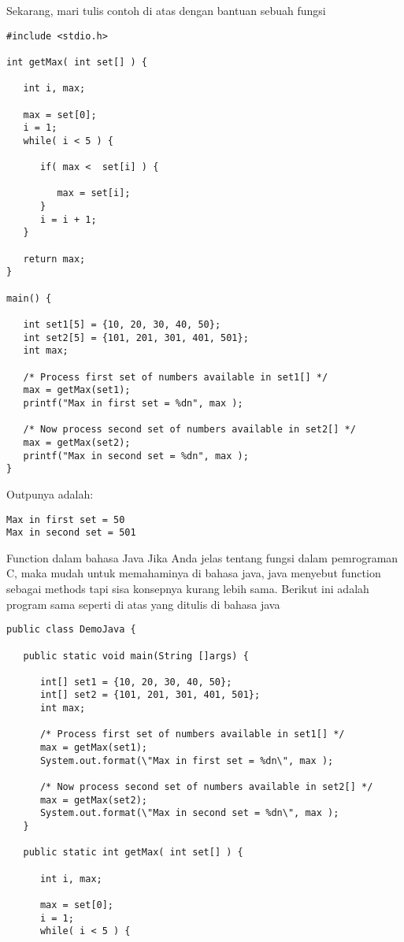 Sekarang, mari tulis contoh di atas dengan bantuan sebuah fungsi
\begin {verbatim}
#include <stdio.h>
 
int getMax( int set[] ) {
 
   int i, max;
    
   max = set[0];
   i = 1;    
   while( i < 5 ) {
   
      if( max <  set[i] ) {
     
         max = set[i];
      }
      i = i + 1;
   }
     
   return max;
}
 
main() {
 
   int set1[5] = {10, 20, 30, 40, 50};
   int set2[5] = {101, 201, 301, 401, 501};
   int max;
 
   /* Process first set of numbers available in set1[] */
   max = getMax(set1);
   printf("Max in first set = %
     
   /* Now process second set of numbers available in set2[] */
   max = getMax(set2);
   printf("Max in second set = %
}
\end {verbatim}
Outpunya adalah: 
\begin {verbatim}
Max in first set = 50
Max in second set = 501
\end {verbatim}

Function dalam bahasa Java
Jika Anda jelas tentang fungsi dalam pemrograman C, maka mudah untuk memahaminya di bahasa java, java menyebut function sebagai methods tapi sisa konsepnya kurang lebih sama. 
Berikut ini adalah program sama seperti di atas yang ditulis di bahasa java 
\begin {verbatim}
public class DemoJava {
     
   public static void main(String []args) {
  
      int[] set1 = {10, 20, 30, 40, 50};
      int[] set2 = {101, 201, 301, 401, 501};
      int max;
 
      /* Process first set of numbers available in set1[] */
      max = getMax(set1);
      System.out.format(\"Max in first set = %
 
      /* Now process second set of numbers available in set2[] */
      max = getMax(set2);
      System.out.format(\"Max in second set = %
   }
    
   public static int getMax( int set[] ) {
  
      int i, max;
    
      max = set[0];
      i = 1;    
      while( i < 5 ) {
 

\end{verbatim}
